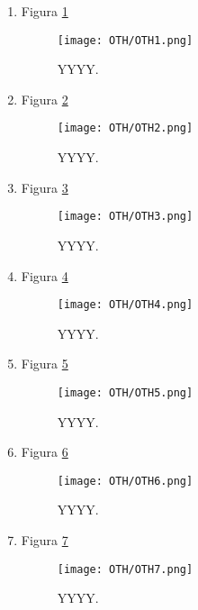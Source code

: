 \begin{enumerate}
\item Figura \ref{OTH1}
\begin{figure}[H] %
\begin{center}
\texttt{[image: OTH/OTH1.png]}
\end{center}
\caption{YYYY.}
\label{OTH1}
\end{figure}

\item Figura \ref{OTH2}
\begin{figure}[H] %
\begin{center}
\texttt{[image: OTH/OTH2.png]}
\end{center}
\caption{YYYY.}
\label{OTH2}
\end{figure}

\item Figura \ref{OTH3}
\begin{figure}[H] %
\begin{center}
\texttt{[image: OTH/OTH3.png]}
\end{center}
\caption{YYYY.}
\label{OTH3}
\end{figure}

\item Figura \ref{OTH4}
\begin{figure}[H] %
\begin{center}
\texttt{[image: OTH/OTH4.png]}
\end{center}
\caption{YYYY.}
\label{OTH4}
\end{figure}

\item Figura \ref{OTH5}
\begin{figure}[H] %
\begin{center}
\texttt{[image: OTH/OTH5.png]}
\end{center}
\caption{YYYY.}
\label{OTH5}
\end{figure}

\item Figura \ref{OTH6}
\begin{figure}[H] %
\begin{center}
\texttt{[image: OTH/OTH6.png]}
\end{center}
\caption{YYYY.}
\label{OTH6}
\end{figure}

\item Figura \ref{OTH7}
\begin{figure}[H] %
\begin{center}
\texttt{[image: OTH/OTH7.png]}
\end{center}
\caption{YYYY.}
\label{OTH7}
\end{figure}


\end{enumerate}




